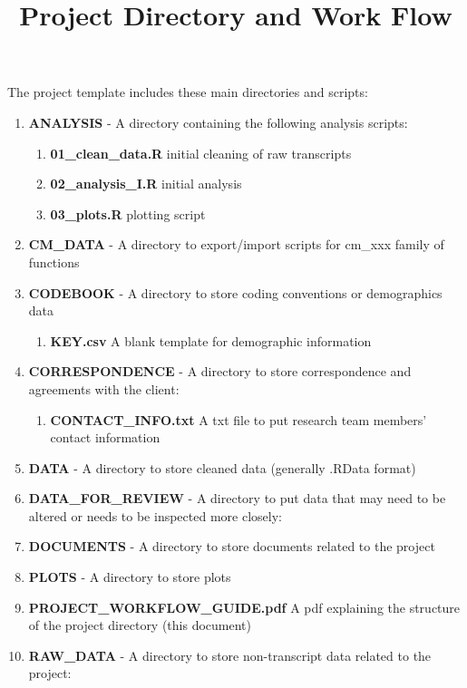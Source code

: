 \documentclass{article}\usepackage{graphicx, color}
\begin{document}
\title{Project Directory and Work Flow}
\author{}
\date{}
\maketitle

The project template includes these main directories and scripts:

\begin{enumerate}
  \item \textbf{ANALYSIS} - A directory containing the following analysis scripts:
  \begin{enumerate}
    \item \textbf{01\_clean\_data.R} initial cleaning of raw transcripts
    \item \textbf{02\_analysis\_I.R} initial analysis
    \item \textbf{03\_plots.R} plotting script
  \end{enumerate}
  \item \textbf{CM\_DATA} - A directory to export/import scripts for cm\_xxx family of functions
  \item \textbf{CODEBOOK} - A directory to store coding conventions or demographics data
  \begin{enumerate}
    \item \textbf{KEY.csv} A blank template for demographic information
  \end{enumerate}  
  \item \textbf{CORRESPONDENCE} - A directory to store correspondence and agreements 
     with the client:
  \begin{enumerate}
     \item \textbf{CONTACT\_INFO.txt} A txt file to put research team members' 
       contact information
  \end{enumerate}  
  \item \textbf{DATA} - A directory to store cleaned data (generally .RData 
     format)
  \item \textbf{DATA\_FOR\_REVIEW} - A directory to put data that may need to be altered or needs to be inspected more closely:
  \item \textbf{DOCUMENTS} - A directory to store documents related to the project
  \item \textbf{PLOTS} - A directory to store plots
  \item \textbf{PROJECT\_WORKFLOW\_GUIDE.pdf} A pdf explaining the structure of the project directory (this document) 
  \item \textbf{RAW\_DATA} - A directory to store non-transcript data related to the project:

\end{enumerate}
\end{document}
